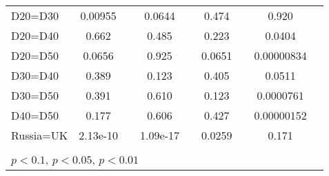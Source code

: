 \begin{tabular}{l|cccccc|cc}
D20=D30         &  0.00955         &         &   0.0644         &         &    0.474         &         &    0.920         &         \\
D20=D40         &    0.662         &         &    0.485         &         &    0.223         &         &   0.0404         &         \\
D20=D50         &   0.0656         &         &    0.925         &         &   0.0651         &         &0.00000834         &         \\
D30=D40         &    0.389         &         &    0.123         &         &    0.405         &         &   0.0511         &         \\
D30=D50         &    0.391         &         &    0.610         &         &    0.123         &         &0.0000761         &         \\
D40=D50         &    0.177         &         &    0.606         &         &    0.427         &         &0.00000152         &         \\
Russia=UK       & 2.13e-10         &         & 1.09e-17         &         &   0.0259         &         &    0.171         &         \\
\hline\hline
\multicolumn{9}{p{16cm}}{\tiny }\\
\multicolumn{9}{l}{\tiny \sym{*} \(p<0.1\), \sym{**} \(p<0.05\), \sym{***} \(p<0.01\)}\\
\end{tabular}